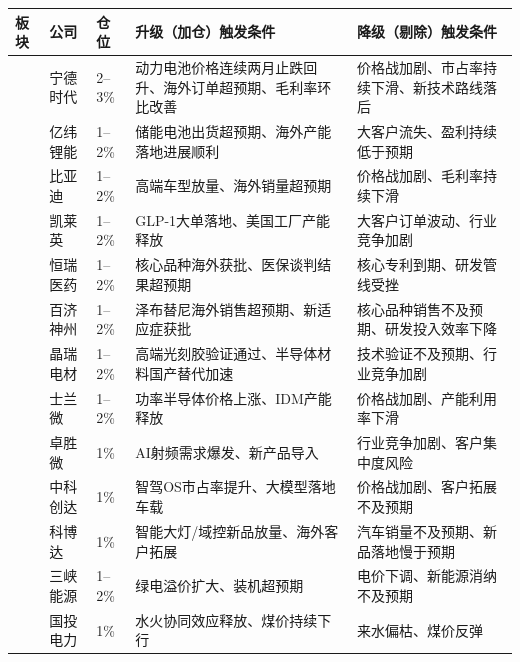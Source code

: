 \begin{exhibitbox}
\centering
\scriptsize
\setlength{\tabcolsep}{3pt}
\setlength{\aboverulesep}{0pt}
\setlength{\belowrulesep}{0pt}
\begin{tabularx}{\linewidth}{L{2.2cm} L{1.8cm} C{1.0cm} X X}
\toprule
\textbf{板块} & \textbf{公司} & \textbf{仓位} & \textbf{升级（加仓）触发条件} & \textbf{降级（剔除）触发条件} \\
\midrule
{}
& 宁德时代 & 2--3\% & 动力电池价格连续两月止跌回升、海外订单超预期、毛利率环比改善 & 价格战加剧、市占率持续下滑、新技术路线落后 \\
& 亿纬锂能 & 1--2\% & 储能电池出货超预期、海外产能落地进展顺利 & 大客户流失、盈利持续低于预期 \\
 & 比亚迪 & 1--2\% & 高端车型放量、海外销量超预期 & 价格战加剧、毛利率持续下滑 \\
\midrule
{}
& 凯莱英 & 1--2\% & GLP-1大单落地、美国工厂产能释放 & 大客户订单波动、行业竞争加剧 \\
& 恒瑞医药 & 1--2\% & 核心品种海外获批、医保谈判结果超预期 & 核心专利到期、研发管线受挫 \\
 & 百济神州 & 1--2\% & 泽布替尼海外销售超预期、新适应症获批 & 核心品种销售不及预期、研发投入效率下降 \\
\midrule
{}
& 晶瑞电材 & 1--2\% & 高端光刻胶验证通过、半导体材料国产替代加速 & 技术验证不及预期、行业竞争加剧 \\
& 士兰微 & 1--2\% & 功率半导体价格上涨、IDM产能释放 & 价格战加剧、产能利用率下滑 \\
 & 卓胜微 & 1\% & AI射频需求爆发、新产品导入 & 行业竞争加剧、客户集中度风险 \\
\midrule
{}
& 中科创达 & 1\% & 智驾OS市占率提升、大模型落地车载 & 价格战加剧、客户拓展不及预期 \\
 & 科博达 & 1\% & 智能大灯/域控新品放量、海外客户拓展 & 汽车销量不及预期、新品落地慢于预期 \\
\midrule
{}
& 三峡能源 & 1--2\% & 绿电溢价扩大、装机超预期 & 电价下调、新能源消纳不及预期 \\
 & 国投电力 & 1\% & 水火协同效应释放、煤价持续下行 & 来水偏枯、煤价反弹 \\

\end{tabularx}
\end{exhibitbox}
